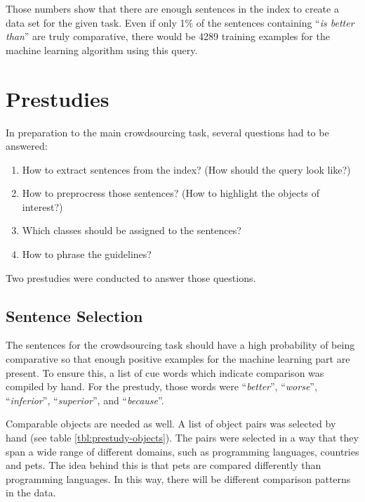 Those numbers show that there are enough sentences in the index to create a data set for the given task. Even if only 1\% of the sentences containing \enquote{\emph{is better than}} are truly comparative, there would be 4289 training examples for the machine learning algorithm using this query.


\section{Prestudies}
In preparation to the main crowdsourcing task, several questions had to be answered:
\begin{enumerate}
\item How to extract sentences from the index? (How should the query look like?)
\item How to preprocress those sentences? (How to highlight the objects of interest?)
\item Which classes should be assigned to the sentences?
\item How to phrase the guidelines?
\end{enumerate}

Two prestudies were conducted to answer those questions.



\subsection{Sentence Selection}
The sentences for the crowdsourcing task should have a high probability of being comparative so that enough positive examples for the machine learning part are present. To ensure this, a list of cue words which indicate comparison was compiled by hand. For the prestudy, those words were \enquote{\emph{better}}, \enquote{\emph{worse}}, \enquote{\emph{inferior}}, \enquote{\emph{superior}}, and \enquote{\emph{because}}. 

Comparable objects are needed as well. A list of object pairs was selected by hand (see table \ref{tbl:prestudy-objects}). The pairs were selected in a way that they span a wide range of different domains, such as programming languages, countries and pets. The idea behind this is that pets are compared differently than programming languages. In this way, there will be different comparison patterns in the data.

